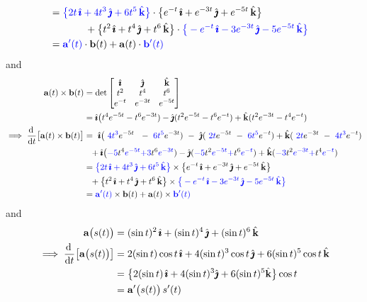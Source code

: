 \begin{eg}
\begin{align*}
\\
&=\textcolor{blue}{\big\{2t\,\hat{\pmb{\imath}}+4t^3\,\hat{\pmb{\jmath}}+6t^5\,\hat{\mathbf{k}}\big\}}\cdot
           \big\{e^{-t}\,\hat{\pmb{\imath}} + e^{-3t}\,\hat{\pmb{\jmath}} + e^{-5t}\,\hat{\mathbf{k}}\big\}\\&\hskip0.5in
  +\big\{t^2\,\hat{\pmb{\imath}} + t^4\,\hat{\pmb{\jmath}} + t^6\,\hat{\mathbf{k}}\big\}\cdot
         \textcolor{blue}{\big\{-e^{-t}\,\hat{\pmb{\imath}}-3e^{-3t}\,\hat{\pmb{\jmath}}-5e^{-5t}\,\hat{\mathbf{k}}\big\}}
\\
&=\textcolor{blue}{\mathbf{a}'(t)}\cdot\mathbf{b}(t)+\mathbf{a}(t)\cdot\textcolor{blue}{\mathbf{b}'(t)}
\end{align*}
and
\begin{align*}
\va(t)\times\vb(t) 
&=\det\left[\begin{matrix}\hi& \hj &\hk\\ 
                            t^2 & t^4 & t^6\\ 
                            e^{-t} & e^{-3t} & e^{-5t}\end{matrix}\right] \\
&=\hi\big(t^4 e^{-5t}-t^6 e^{-3t}) 
  -\hj(t^2 e^{-5t}- t^6 e^{-t}) 
   +\hk(t^2 e^{-3t}-t^4 e^{-t})
\\
\implies \diff{}{t}\big[\va(t)\times\vb(t)\big]
&=\ \hi\big(\ \textcolor{blue}{4t^3} e^{-5t}\ \ 
        -\ \textcolor{blue}{6t^5} e^{-3t}) 
  \ -\ \hj(\ \textcolor{blue}{2t} e^{-5t}
      \ -\  \textcolor{blue}{6t^5} e^{-t}) 
   +\hk(\ \textcolor{blue}{2t} e^{-3t}
   \ -\ \textcolor{blue}{4t^3} e^{-t}) \\&\hskip0.1in
 +\hi\big(\textcolor{blue}{-5}t^4 \textcolor{blue}{e^{-5t}}
           \textcolor{blue}{+3}t^6 \textcolor{blue}{e^{-3t}}) 
  -\hj(\textcolor{blue}{-5}t^2 \textcolor{blue}{e^{-5t}}
          \textcolor{blue}{+} t^6 \textcolor{blue}{e^{-t}}) 
   +\hk(\textcolor{blue}{-3}t^2 \textcolor{blue}{e^{-3t}}
     \textcolor{blue}{+}t^4 \textcolor{blue}{e^{-t}})
\\
&=\textcolor{blue}{\big\{2t\,\hi+4t^3\,\hj+6t^5\,\hk\big\}}\times
           \big\{e^{-t}\,\hi + e^{-3t}\,\hj + e^{-5t}\,\hk\big\}\\&\hskip0.1in
  +\big\{t^2\,\hi + t^4\,\hj + t^6\,\hk\big\}\times
         \textcolor{blue}{\big\{-e^{-t}\,\hi-3e^{-3t}\,\hj-5e^{-5t}\,\hk\big\}}
\\
&=\textcolor{blue}{\va'(t)}\times\vb(t)+\va(t)\times\textcolor{blue}{\vb'(t)}
\end{align*}
and
\begin{align*}
\va\big(s(t)\big)
&=(\sin t)^2\,\hi +(\sin t)^4\,\hj + (\sin t)^6\,\hk
\\
\implies \diff{}{t}\big[\va\big(s(t)\big)\big]
&=2(\sin t)\cos t\,\hi +4(\sin t)^3\cos t\,\hj + 6(\sin t)^5\cos t\,\hk
\\
&=\big\{2(\sin t)\,\hi +4(\sin t)^3\hj + 6(\sin t)^5\hk\big\}\cos t 
\\
&=\va'\big(s(t)\big)\,s'(t)
\end{align*}
\end{eg}

